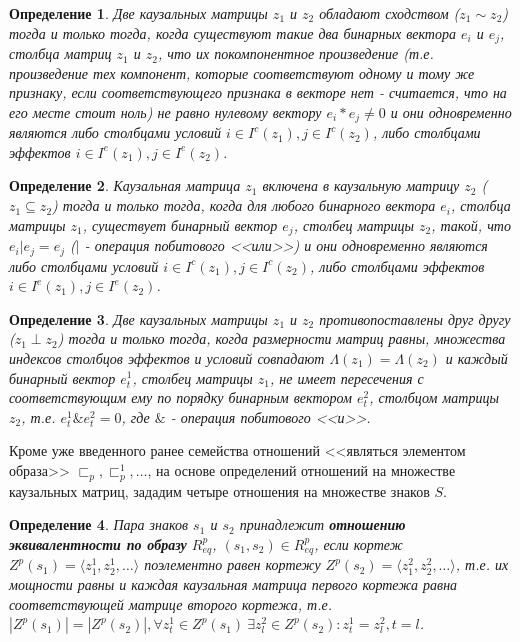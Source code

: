 \documentclass[12pt]{scrartcl}
\newtheorem{definition}{Определение}
\begin{document}
	\begin{definition}
		Две каузальных матрицы $z_1$ и $z_2$ обладают сходством ($z_1\sim z_2$) тогда и только тогда, когда  существуют такие два бинарных вектора $e_i$ и $e_j$, столбца матриц $z_1$ и $z_2$, что их покомпонентное произведение (т.е. произведение тех компонент, которые соответствуют одному и тому же признаку, если соответствующего признака в векторе нет - считается, что на его месте стоит ноль) не равно нулевому вектору $e_i*e_j\not = 0$ и они одновременно являются либо столбцами условий $i\in I^c(z_1), j\in I^c(z_2)$, либо столбцами эффектов $i\in I^e(z_1), j\in I^e(z_2)$.
	\end{definition}
	
	\begin{definition}
		Каузальная матрица $z_1$ включена в каузальную матрицу $z_2$ ($z_1\subseteq z_2$) тогда и только тогда, когда  для любого бинарного вектора $e_i$, столбца матрицы $z_1$, существует бинарный вектор $e_j$, столбец матрицы $z_2$, такой, что $e_i | e_j=e_j$ ($|$ - операция побитового <<или>>) и они одновременно являются либо столбцами условий $i\in I^c(z_1), j\in I^c(z_2)$, либо столбцами эффектов $i\in I^e(z_1), j\in I^e(z_2)$.
	\end{definition}
	
	\begin{definition}
		Две каузальных матрицы $z_1$ и $z_2$ противопоставлены друг другу ($z_1\perp z_2$) тогда и только тогда, когда размерности матриц равны, множества индексов столбцов эффектов и условий совпадают $\Lambda({z_1})=\Lambda({z_2})$ и каждый бинарный вектор $e_t^1$, столбец матрицы $z_1$, не имеет пересечения с соответствующим ему по порядку бинарным вектором $e_t^2$, столбцом матрицы $z_2$, т.е. $e_t^1\& e_t^2=0$, где $\&$ - операция побитового <<и>>.
	\end{definition}
	
	Кроме уже введенного ранее семейства отношений <<являться элементом образа>> ${\sqsubset_p, \sqsubset_p^1, \dots}$, на основе определений отношений на множестве каузальных матриц, зададим четыре отношения на множестве знаков $S$.
	\begin{definition}
		Пара знаков  $s_1$ и $s_2$ принадлежит \textbf{отношению эквивалентности по образу} $R_{eq}^p$, $(s_1,s_2)\in R_{eq}^p$, если кортеж $Z^p(s_1)=\langle z_1^1,z_2^1,\dots\rangle$ поэлементно равен кортежу $Z^p(s_2)=\langle z_1^2,z_2^2,\dots\rangle$, т.е. их мощности равны и каждая каузальная матрица первого кортежа равна соответствующей матрице второго кортежа, т.е. $|Z^p(s_1)| = |Z^p(s_2)|, \forall z_t^1\in Z^p(s_1)\ \exists z_l^2\in Z^p(s_2): z_t^1=z_l^2, t=l$.
	\end{definition}
	
\end{document}
